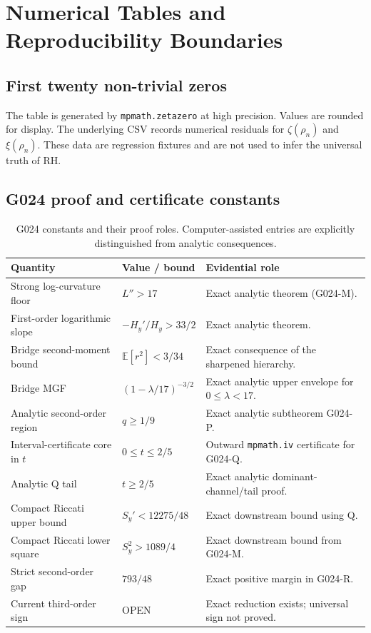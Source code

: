 \chapter{Numerical Tables and Reproducibility Boundaries}
\label{app:numerical}

\section{First twenty non-trivial zeros}


The table is generated by \texttt{mpmath.zetazero} at high precision. Values are rounded for display. The underlying CSV records numerical residuals for $\zeta(\rho_n)$ and $\xi(\rho_n)$. These data are regression fixtures and are not used to infer the universal truth of RH.

\section{G024 proof and certificate constants}
\begin{table}[htbp]
\centering
\small
\begin{tabular}{p{}p{}p{}}
\toprule
Quantity & Value / bound & Evidential role\\
\midrule
Strong log-curvature floor & $L''>17$ & Exact analytic theorem (G024-M).\\
First-order logarithmic slope & $-H_y'/H_y>33/2$ & Exact analytic theorem.\\
Bridge second-moment bound & $\mathbb E[r^2]<3/34$ & Exact consequence of the sharpened hierarchy.\\
Bridge MGF & $(1-\lambda/17)^{-3/2}$ & Exact analytic upper envelope for $0\le\lambda<17$.\\
Analytic second-order region & $q\ge1/9$ & Exact analytic subtheorem G024-P.\\
Interval-certificate core in $t$ & $0\le t\le2/5$ & Outward \texttt{mpmath.iv} certificate for G024-Q.\\
Analytic Q tail & $t\ge2/5$ & Exact analytic dominant-channel/tail proof.\\
Compact Riccati upper bound & $S_y'<12275/48$ & Exact downstream bound using Q.\\
Compact Riccati lower square & $S_y^2>1089/4$ & Exact downstream bound from G024-M.\\
Strict second-order gap & $793/48$ & Exact positive margin in G024-R.\\
Current third-order sign & OPEN & Exact reduction exists; universal sign not proved.\\
\bottomrule
\end{tabular}
\caption{G024 constants and their proof roles. Computer-assisted entries are explicitly distinguished from analytic consequences.}
\label{tab:g024-certificate-constants}
\end{table}

